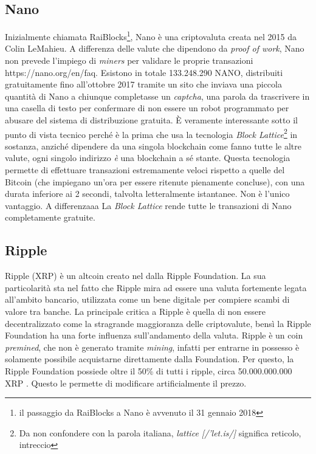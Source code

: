 \documentclass {article}
\begin{document}
\subsection {Nano}


Inizialmente chiamata RaiBlocks\footnote{il passaggio da RaiBlocks a Nano è avvenuto il 31 gennaio 2018}, Nano è una criptovaluta creata nel 2015 da Colin LeMahieu.
A differenza delle valute che dipendono da \textit{proof of work}, Nano non prevede l'impiego di \textit{miners} per validare le proprie transazioni https://nano.org/en/faq.
Esistono in totale 133.248.290 NANO, distribuiti gratuitamente fino all'ottobre 2017 tramite un sito che inviava una piccola quantità di Nano a chiunque completasse un \textit{captcha}, una parola da trascrivere in una casella di testo per confermare di non essere un robot programmato per abusare del sistema di distribuzione gratuita.
È veramente interessante sotto il punto di vista tecnico perché è la prima che usa la tecnologia \textit{Block Lattice}\footnote{Da non confondere con la parola italiana, \textit{lattice [/'let.is/]} significa reticolo, intreccio} in sostanza, anziché dipendere da una singola blockchain come fanno tutte le altre valute, ogni singolo indirizzo \emph{è} una blockchain a sé stante.
Questa tecnologia permette di effettuare transazioni estremamente veloci rispetto a quelle del Bitcoin (che impiegano un'ora per essere ritenute pienamente concluse), con una durata inferiore ai 2 secondi, talvolta letteralmente istantanee.
Non è l'unico vantaggio. A differenzaaa %
La \textit{Block Lattice} rende tutte le transazioni di Nano completamente gratuite.


\subsection {Ripple}


Ripple (XRP) è un altcoin creato nel dalla Ripple Foundation.%
La sua particolarità sta nel fatto che Ripple mira ad essere una valuta fortemente legata all'ambito bancario, utilizzata come un bene digitale per compiere scambi di valore tra banche.
La principale critica a Ripple è quella di non essere decentralizzato come la stragrande maggioranza delle criptovalute, bensì la Ripple Foundation ha una forte influenza sull'andamento della valuta.
Ripple è un coin \textit{premined}, che non è generato tramite \textit{mining}, infatti per entrarne in possesso è solamente possibile acquistarne direttamente dalla Foundation.
Per questo, la Ripple Foundation possiede oltre il 50\% di tutti i ripple, circa 50.000.000.000 XRP \cite{ripple}. Questo le permette di modificare artificialmente il prezzo.
\end{document}
